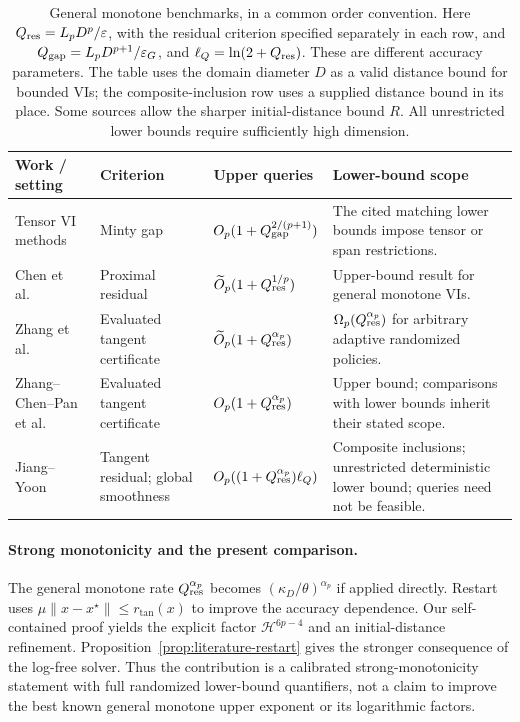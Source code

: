 \documentclass[11pt]{article}
\numberwithin{equation}{section}
\theoremstyle{definition}
\theoremstyle{remark}
\newcommand{\ap}{\alpha_p}
\begin{document}
\begin{table}[t]
\centering\small
\setlength{\tabcolsep}{4pt}
\renewcommand{\arraystretch}{1.18}
\begin{tabularx}{\textwidth}{@{}L{0.25\textwidth}L{0.17\textwidth}L{0.20\textwidth}Y@{}}
\toprule
Work / setting & Criterion & Upper queries & Lower-bound scope\\
\midrule
Tensor VI methods\newline\cite{adil2022,lin2024}
& Minty gap & $O_p(1+Q_{\rm gap}^{2/(p+1)})$
& The cited matching lower bounds impose tensor or span restrictions.\\
Chen et al.\ \cite{chen2026halpern}
& Proximal residual
& $\widetilde O_p(1+Q_{\rm res}^{1/p})$
& Upper-bound result for general monotone VIs.\\
Zhang et al.\ \cite{zhang2026}
& Evaluated tangent certificate
& $\widetilde O_p(1+Q_{\rm res}^{\ap})$
& $\Omega_p(Q_{\rm res}^{\ap})$ for arbitrary adaptive randomized policies.\\
Zhang--Chen--Pan et al.\ \cite{zhangchen2026}
& Evaluated tangent certificate
& $O_p(1+Q_{\rm res}^{\ap})$
& Upper bound; comparisons with lower bounds inherit their stated scope.\\
Jiang--Yoon\ \cite{jiangyoon2026}
& Tangent residual; global smoothness
& $O_p((1+Q_{\rm res}^{\ap})\ell_Q)$
& Composite inclusions; unrestricted deterministic lower bound;
queries need not be feasible.\\
\bottomrule
\end{tabularx}
\caption{General monotone benchmarks, in a common order convention.
Here $Q_{\rm res}=L_pD^p/\varepsilon$, with the residual criterion
specified separately in each row, and
$Q_{\rm gap}=L_pD^{p+1}/\varepsilon_G$, and
$\ell_Q=\ln(2+Q_{\rm res})$. These are different accuracy
parameters. The table uses the domain diameter $D$ as a valid distance
bound for bounded VIs; the composite-inclusion row uses a supplied
distance bound in its place. Some sources allow the sharper
initial-distance bound $R$. All unrestricted lower bounds require
sufficiently high dimension.}
\label{tab:general-comparison}
\end{table}

\paragraph{Strong monotonicity and the present comparison.}
The general monotone rate $Q_{\rm res}^{\ap}$ becomes
$(\kappa_D/\theta)^{\ap}$ if applied directly. Restart uses
$\mu\|x-x^\star\|\le r_{\mathrm{tan}}(x)$ to improve the accuracy
dependence. Our self-contained proof yields the explicit factor
$\mathcal H^{6p-4}$ and an initial-distance refinement.
Proposition~\ref{prop:literature-restart} gives the stronger consequence
of the log-free solver. Thus the contribution is a calibrated
strong-monotonicity statement with full randomized lower-bound
quantifiers, not a claim to improve the best known general monotone
upper exponent or its logarithmic factors.
\end{document}

